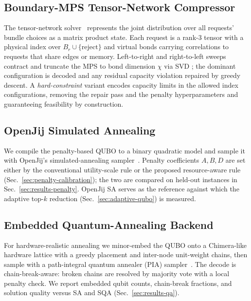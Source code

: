 \documentclass[twocolumn]{article}
\begin{document}
\subsection{Boundary-MPS Tensor-Network Compressor}
\label{sec:tn}

The tensor-network solver~\cite{rosales2025quantum,hao2022quantum,
nakada2025quick} represents the joint distribution over all requests'
bundle choices as a matrix product state.  Each request is a rank-3
tensor with a physical index over $B_r \cup \{\text{reject}\}$ and
virtual bonds carrying correlations to requests that share edges or
memory.  Left-to-right and right-to-left sweeps contract and truncate
the MPS to bond dimension $\chi$ via SVD
\cite{white1992dmrg,vidal2003efficient}; the dominant configuration is
decoded and any residual capacity violation repaired by greedy
descent.  A \emph{hard-constraint} variant
\cite{nakada2025quick} encodes capacity limits in the allowed index
configurations, removing the repair pass and the penalty
hyperparameters and guaranteeing feasibility by construction.

\subsection{OpenJij Simulated Annealing}
\label{sec:openjij}

We compile the penalty-based QUBO to a binary quadratic model and sample it with
OpenJij's simulated-annealing sampler~\cite{openjij}.  Penalty
coefficients $A,B,D$ are set either by the conventional utility-scale
rule or the proposed resource-aware rule (Sec.~\ref{sec:penalty-calibration});
the two are compared on held-out instances in
Sec.~\ref{sec:results-penalty}.  OpenJij SA serves as the
reference against which the adaptive top-$k$ reduction
(Sec.~\ref{sec:adaptive-qubo}) is measured.

\subsection{Embedded Quantum-Annealing Backend}
\label{sec:qa}

For hardware-realistic annealing we minor-embed the QUBO onto a
Chimera-like hardware lattice with a greedy placement and inter-node
unit-weight chains, then sample with a path-integral quantum annealer
(PIA) sampler~\cite{openjij,venegas2018quantum}.  The decode is
chain-break-aware: broken chains are resolved by majority vote with a
local penalty check.  We report embedded qubit counts, chain-break
fractions, and solution quality versus SA and SQA
(Sec.~\ref{sec:results-qa}).
\end{document}
